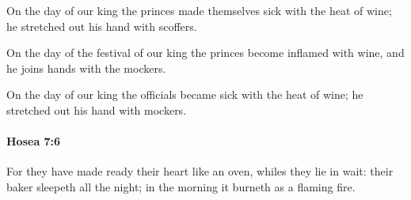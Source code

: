 			\begin{versebox}
					\item[BHS] 
					\item[LXX] 
					\item[ASV] On the day of our king the princes made themselves sick with the heat of wine; he stretched out his hand with scoffers.
					\item[NIV] On the day of the festival of our king the princes become inflamed with wine, and he joins hands with the mockers.
					\item[NRSV] On the day of our king the officials became sick with the heat of wine; he stretched out his hand with mockers.
			\end{versebox}

		\paragraph{Hosea 7:6} %
			\label{HOSEA-7-6}

			For they have made ready their heart like an oven, whiles they lie in wait: their baker sleepeth all the night; in the morning it burneth as a flaming fire.

